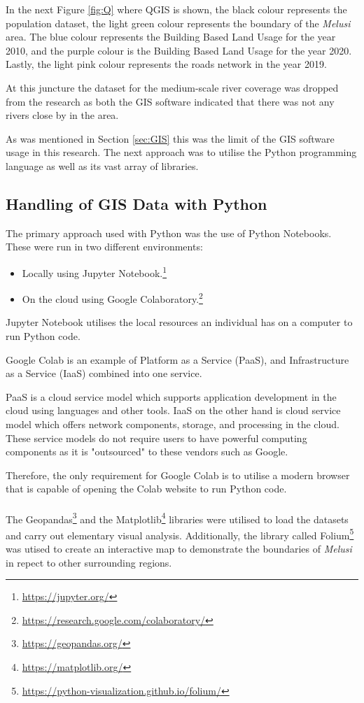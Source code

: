 In the next Figure \ref{fig:Q} where QGIS is shown, the black colour represents the population dataset, the light green colour represents the boundary of the \textit{Melusi} area. The blue colour represents the Building Based Land Usage for the year 2010, and the purple colour is the Building Based Land Usage for the year 2020. Lastly, the light pink colour represents the roads network in the year 2019.

At this juncture the dataset for the medium-scale river coverage was dropped from the research as both the GIS software indicated that there was not any rivers close by  in the area.

As was mentioned in Section \ref{sec:GIS} this was the limit of the GIS software usage in this research. The next approach was to utilise the Python programming language as well as its vast array of libraries.
\subsection{Handling of GIS Data with Python}
The primary approach used with Python was the use of Python Notebooks. These were run in two different environments:
\begin{itemize}
\item Locally using Jupyter Notebook.\footnote{\url{https://jupyter.org/}}
\item On the cloud using Google Colaboratory.\footnote{\url{https://research.google.com/colaboratory/}}
\end{itemize}
Jupyter Notebook utilises the local resources an individual has on a computer to run Python code.

Google Colab is an example of Platform as a Service (PaaS), and Infrastructure as a Service (IaaS) combined into one service.

PaaS is a cloud service model which supports application development in the cloud using languages and other tools. IaaS on the other hand is cloud service model which offers network components, storage, and processing in the cloud.\cite{pf} These service models do not require users to have powerful computing components as it is "outsourced" to these vendors such as Google.

Therefore, the only requirement for Google Colab is to utilise a modern browser that is capable of opening the Colab website to run Python code.
\\\\
The Geopandas\footnote{\url{https://geopandas.org/}} and the Matplotlib\footnote{\url{https://matplotlib.org/}} libraries were utilised to load the datasets and carry out elementary visual analysis. Additionally, the library called Folium\footnote{\url{https://python-visualization.github.io/folium/}} was utised to create an interactive map to demonstrate the boundaries of \textit{Melusi} in repect to other surrounding regions.

